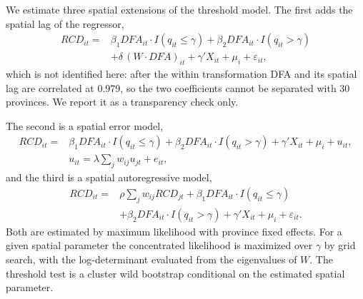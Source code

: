 We estimate three spatial extensions of the threshold model. The first adds the spatial lag of the regressor,
\begin{equation}
\begin{aligned}
RCD_{it}={}&\beta_1 DFA_{it}\cdot I(q_{it}\leq\gamma)
+\beta_2 DFA_{it}\cdot I(q_{it}>\gamma)\\
&+\delta\,(W\!\cdot\!DFA)_{it}+\gamma'X_{it}+\mu_i+\varepsilon_{it},
\end{aligned}
\label{eq:slx}
\end{equation}
which is not identified here: after the within transformation DFA and its spatial lag are correlated at 0.979, so the two coefficients cannot be separated with 30 provinces. We report it as a transparency check only.

The second is a spatial error model,
\begin{equation}
\begin{aligned}
RCD_{it}={}&\beta_1 DFA_{it}\cdot I(q_{it}\leq\gamma)
+\beta_2 DFA_{it}\cdot I(q_{it}>\gamma)
+\gamma'X_{it}+\mu_i+u_{it},\\
&u_{it}=\lambda\sum_j w_{ij}u_{jt}+e_{it},
\end{aligned}
\label{eq:sem}
\end{equation}
and the third is a spatial autoregressive model,
\begin{equation}
\begin{aligned}
RCD_{it}={}&\rho\sum_j w_{ij}RCD_{jt}
+\beta_1 DFA_{it}\cdot I(q_{it}\leq\gamma)\\
&+\beta_2 DFA_{it}\cdot I(q_{it}>\gamma)
+\gamma'X_{it}+\mu_i+\varepsilon_{it}.
\end{aligned}
\label{eq:sar}
\end{equation}
Both are estimated by maximum likelihood with province fixed effects. For a given spatial parameter the concentrated likelihood is maximized over $\gamma$ by grid search, with the log-determinant evaluated from the eigenvalues of $W$. The threshold test is a cluster wild bootstrap conditional on the estimated spatial parameter.
